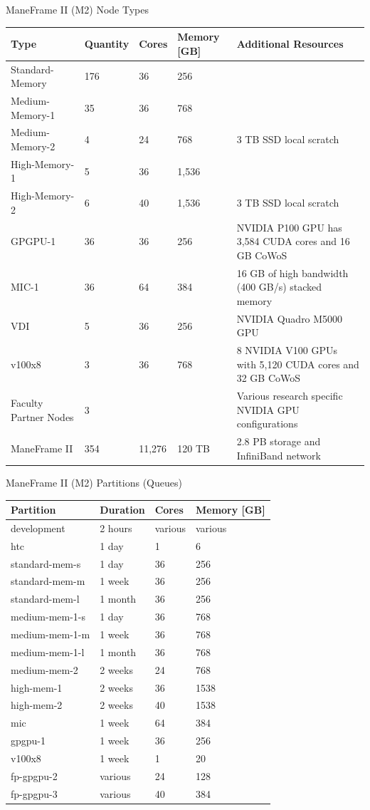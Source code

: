 \begin{frame}{ManeFrame II (M2) Node Types}
\begin{table}
\tiny
\begin{tabular}{lllll}
\toprule
Type & Quantity & Cores & Memory [GB] & Additional Resources\\
\midrule
Standard-Memory & 176 & 36 & 256 & \\
Medium-Memory-1 & 35 & 36 & 768 & \\
Medium-Memory-2 & 4 & 24 & 768 & 3 TB SSD local scratch\\
High-Memory-1 & 5 & 36 & 1,536 & \\
High-Memory-2 & 6 & 40 & 1,536 & 3 TB SSD local scratch\\
GPGPU-1 & 36 & 36 & 256 & NVIDIA P100 GPU has 3,584 CUDA cores and 16 GB CoWoS\\
MIC-1 & 36 & 64 & 384 & 16 GB of high bandwidth (400 GB/s) stacked memory\\
VDI & 5 & 36 & 256 & NVIDIA Quadro M5000 GPU\\
v100x8 & 3 & 36 & 768 & 8 NVIDIA V100 GPUs with 5,120 CUDA cores and 32 GB CoWoS\\
Faculty Partner Nodes & 3 &  &  & Various research specific NVIDIA GPU configurations\\
\midrule
ManeFrame II & 354 & 11,276 & 120 TB & 2.8 PB storage and InfiniBand network\\
\bottomrule
\end{tabular}
\end{table}
\end{frame}

\begin{frame}{ManeFrame II (M2) Partitions (Queues)}
\begin{table}
\tiny
\begin{tabular}{llll}
\toprule
Partition & Duration & Cores & Memory [GB]\\
\midrule
development & 2 hours & various & various\\
htc & 1 day & 1 & 6\\
standard-mem-s & 1 day & 36 & 256\\
standard-mem-m & 1 week & 36 & 256\\
standard-mem-l & 1 month & 36 & 256\\
medium-mem-1-s & 1 day & 36 & 768\\
medium-mem-1-m & 1 week & 36 & 768\\
medium-mem-1-l & 1 month & 36 & 768\\
medium-mem-2 & 2 weeks & 24 & 768\\
high-mem-1 & 2 weeks & 36 & 1538\\
high-mem-2 & 2 weeks & 40 & 1538\\
mic & 1 week & 64 & 384\\
gpgpu-1 & 1 week & 36 & 256\\
v100x8 & 1 week & 1 & 20\\
fp-gpgpu-2 & various & 24 & 128\\
fp-gpgpu-3 & various & 40 & 384\\
\bottomrule
\end{tabular}
\end{table}
\end{frame}

